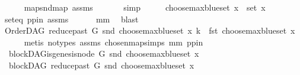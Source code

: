 \begin{isabellebody}
\ \ \ \ \isamarkupfalse%
\ map{\isacharunderscore}{\kern0pt}snd{\isacharunderscore}{\kern0pt}map\ assms{\isacharparenleft}{\kern0pt}{}{\isacharparenright}{\kern0pt}\ \isanewline
\ \ \ \ \isamarkupfalse%
\ simp\isanewline
\ \ \isamarkupfalse%
\ \isamarkupfalse%
\ {\isachardoublequoteopen}choose{\isacharunderscore}{\kern0pt}max{\isacharunderscore}{\kern0pt}blue{\isacharunderscore}{\kern0pt}set\ x\ {\isasymin}\ set\ x{\isachardoublequoteclose}\ \isamarkupfalse%
\ seteq\ pp{\isacharunderscore}{\kern0pt}in\ assms{\isacharparenleft}{\kern0pt}{}{\isacharparenright}{\kern0pt}\isanewline
\ \ \ \ \ \ mm\ \isamarkupfalse%
\ blast\ \isanewline
\ \ \isamarkupfalse%
\ {\isachardoublequoteopen}OrderDAG\ {\isacharparenleft}{\kern0pt}reduce{\isacharunderscore}{\kern0pt}past\ G\ {\isacharparenleft}{\kern0pt}snd\ {\isacharparenleft}{\kern0pt}choose{\isacharunderscore}{\kern0pt}max{\isacharunderscore}{\kern0pt}blue{\isacharunderscore}{\kern0pt}set\ x{\isacharparenright}{\kern0pt}{\isacharparenright}{\kern0pt}{\isacharparenright}{\kern0pt}\ k\ {\isacharequal}{\kern0pt}\ fst\ {\isacharparenleft}{\kern0pt}choose{\isacharunderscore}{\kern0pt}max{\isacharunderscore}{\kern0pt}blue{\isacharunderscore}{\kern0pt}set\ x{\isacharparenright}{\kern0pt}{\isachardoublequoteclose}\isanewline
\ \ \ \ \isamarkupfalse%
\ {\isacharparenleft}{\kern0pt}metis\ {\isacharparenleft}{\kern0pt}no{\isacharunderscore}{\kern0pt}types{\isacharparenright}{\kern0pt}\ assms{\isacharparenleft}{\kern0pt}{}{\isacharparenright}{\kern0pt}\ chosen{\isacharunderscore}{\kern0pt}map{\isacharunderscore}{\kern0pt}simps{}\ mm\ pp{\isacharunderscore}{\kern0pt}in{\isacharparenright}{\kern0pt}\ \isanewline
\ \ \isamarkupfalse%
\ {\isachardoublequoteopen}{\isasymnot}\ blockDAG{\isachardot}{\kern0pt}is{\isacharunderscore}{\kern0pt}genesis{\isacharunderscore}{\kern0pt}node\ G\ {\isacharparenleft}{\kern0pt}snd\ {\isacharparenleft}{\kern0pt}choose{\isacharunderscore}{\kern0pt}max{\isacharunderscore}{\kern0pt}blue{\isacharunderscore}{\kern0pt}set\ x{\isacharparenright}{\kern0pt}{\isacharparenright}{\kern0pt}{\isachardoublequoteclose}\isanewline
\ \ \isamarkupfalse%
\ \isamarkupfalse%
\ {\isachardoublequoteopen}\ blockDAG\ {\isacharparenleft}{\kern0pt}reduce{\isacharunderscore}{\kern0pt}past\ G\ {\isacharparenleft}{\kern0pt}snd\ {\isacharparenleft}{\kern0pt}choose{\isacharunderscore}{\kern0pt}max{\isacharunderscore}{\kern0pt}blue{\isacharunderscore}{\kern0pt}set\ x{\isacharparenright}{\kern0pt}{\isacharparenright}{\kern0pt}{\isacharparenright}{\kern0pt}{\isachardoublequoteclose}\isanewline

\end{isabellebody}

